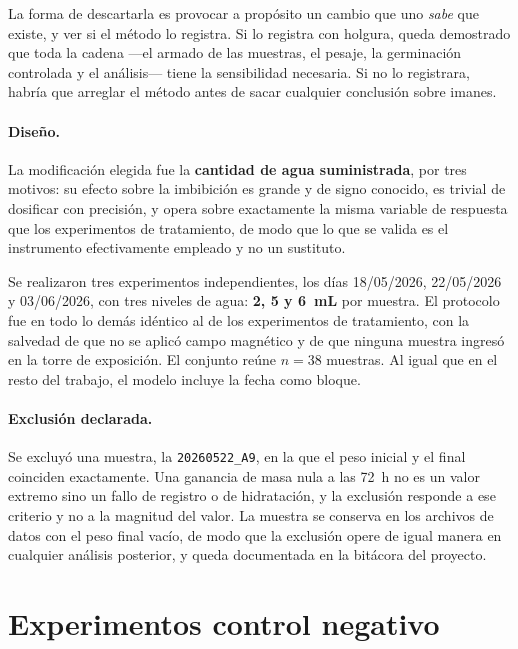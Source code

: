 La forma de descartarla es provocar a propósito un cambio que uno \emph{sabe} que existe, y ver si el método lo registra. Si lo registra con holgura, queda demostrado que toda la cadena ---el armado de las muestras, el pesaje, la germinación controlada y el análisis--- tiene la sensibilidad necesaria. Si no lo registrara, habría que arreglar el método antes de sacar cualquier conclusión sobre imanes.

\paragraph{Diseño.}

La modificación elegida fue la \textbf{cantidad de agua suministrada}, por tres motivos: su efecto sobre la imbibición es grande y de signo conocido, es trivial de dosificar con precisión, y opera sobre exactamente la misma variable de respuesta que los experimentos de tratamiento, de modo que lo que se valida es el instrumento efectivamente empleado y no un sustituto.

Se realizaron tres experimentos independientes, los días 18/05/2026, 22/05/2026 y 03/06/2026, con tres niveles de agua: \textbf{2, 5 y 6~mL} por muestra. El protocolo fue en todo lo demás idéntico al de los experimentos de tratamiento, con la salvedad de que no se aplicó campo magnético y de que ninguna muestra ingresó en la torre de exposición. El conjunto reúne \(n = 38\) muestras. Al igual que en el resto del trabajo, el modelo incluye la fecha como bloque.

\paragraph{Exclusión declarada.}

Se excluyó una muestra, la \texttt{20260522\_A9}, en la que el peso inicial y el final coinciden exactamente. Una ganancia de masa nula a las 72~h no es un valor extremo sino un fallo de registro o de hidratación, y la exclusión responde a ese criterio y no a la magnitud del valor. La muestra se conserva en los archivos de datos con el peso final vacío, de modo que la exclusión opere de igual manera en cualquier análisis posterior, y queda documentada en la bitácora del proyecto.

\section{Experimentos control negativo}
\label{subsec:ctrl_negativo}

